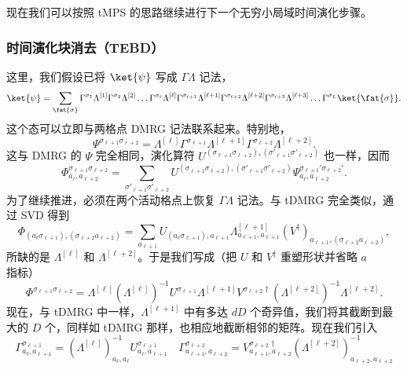 现在我们可以按照 tMPS 的思路继续进行下一个无穷小局域时间演化步骤。   
\subsubsection{时间演化块消去（TEBD）}
这里，我们假设已将 $\ket{\psi}$ 写成 $\Gamma\Lambda$ 记法，
\begin{equation}
\ket{\psi} = \sum_{\fat{\sigma}} 
\Gamma^{\sigma_1} \Lambda^{[1]} \Gamma^{\sigma_2} \Lambda^{[2]} \ldots
\Gamma^{\sigma_{\ell}} \Lambda^{[\ell]}  \Gamma^{\sigma_{\ell+1}} \Lambda^{[\ell+1]}
\Gamma^{\sigma_{\ell+2}} \Lambda^{[\ell+2]}  \Gamma^{\sigma_{\ell+3}} \Lambda^{[\ell+3]} \ldots
\Gamma^{\sigma_L}   
\ket{\fat{\sigma}}.
\label{eq:TEBDstart}
\end{equation}
这个态可以立即与两格点 DMRG 记法联系起来。特别地，
\begin{equation}
\Psi^{\sigma_{\ell+1} \sigma_{\ell+2}} = \Lambda^{[\ell]}  \Gamma^{\sigma_{\ell+1}} \Lambda^{[\ell+1]}
\Gamma^{\sigma_{\ell+2}} \Lambda^{[\ell+2]}  .
\end{equation}
这与 DMRG 的 $\Psi$ 完全相同，演化算符 $U^{(\sigma_{\ell+1} \sigma_{\ell+2}), (\sigma'_{\ell+1} \sigma'_{\ell+2})}$ 也一样，因而  
\begin{equation}
\Phi^{\sigma_{\ell+1}\sigma_{\ell+2}}_{a_\ell, a_{\ell+2}} = \sum_{\sigma'_{\ell+1} \sigma'_{\ell+2}}
U^{(\sigma_{\ell+1} \sigma_{\ell+2}), (\sigma'_{\ell+1} \sigma'_{\ell+2})}  \Psi^{\sigma_{\ell+1}'\sigma_{\ell+2}'}_{a_\ell, a_{\ell+2}} . 
\end{equation} 
为了继续推进，必须在两个活动格点上恢复 $\Gamma\Lambda$ 记法。与 tDMRG 完全类似，通过 SVD 得到
\begin{equation}
\Phi_{(a_\ell \sigma_{\ell+1}), (\sigma_{\ell+2} a_{\ell+2})} = \sum_{a_{\ell+1}} U_{(a_\ell \sigma_{\ell+1}),a_{\ell+1}} \Lambda^{[\ell+1]}_{a_{\ell+1},a_{\ell+1}} (V^\dagger)_{a_{\ell+1}, (\sigma_{\ell+2} a_{\ell+2})} ,
\end{equation}
所缺的是 $\Lambda^{[\ell]}$ 和 $\Lambda^{[\ell+2]}$。于是我们写成（把 $U$ 和 $V^\dagger$ 重塑形状并省略 $a$ 指标）
\begin{equation}
\Phi^{\sigma_{\ell+1}\sigma_{\ell+2}} = \Lambda^{[\ell]} (\Lambda^{[\ell]})^{-1} U^{\sigma_{\ell+1}} 
 \Lambda^{[\ell+1]} V^{\sigma_{\ell+2}\dagger} ( \Lambda^{[\ell+2]})^{-1}  \Lambda^{[\ell+2]} .
\end{equation}
现在，与 tDMRG 中一样，$ \Lambda^{[\ell+1]}$ 中有多达 $dD$ 个奇异值，我们将其截断到最大的 $D$ 个，同样如 tDMRG 那样，也相应地截断相邻的矩阵。现在我们引入
\begin{equation}
\Gamma^{\sigma_{\ell+1}}_{a_\ell,a_{\ell+1}} =  (\Lambda^{[\ell]})^{-1}_{a_\ell,a_\ell} U^{\sigma_{\ell+1}}_{a_\ell,a_{\ell+1}} \quad 
\Gamma^{\sigma_{\ell+2}}_{a_{\ell+1},a_{\ell+2}} =  V^{\sigma_{\ell+2}\dagger}_{a_{\ell+1},a_{\ell+2}} ( \Lambda^{[\ell+2]})^{-1}_{a_{\ell+2},a_{\ell+2}} 
\end{equation}
